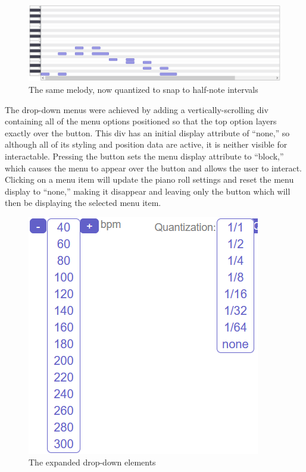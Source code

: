 \begin{figure}[h!]
  \centering
  \includegraphics[width=\linewidth]{image/TwinkleQuantized.png}
  \caption{The same melody, now quantized to snap to half-note intervals}
  \label{fig:twinkle_quantized}
\end{figure}

The drop-down menus were achieved by adding a vertically-scrolling div containing all of the menu
options positioned so that the top option layers exactly over the button. This div has an initial
display attribute of “none,” so although all of its styling and position data are active, it is
neither visible for interactable. Pressing the button sets the menu display attribute to “block,”
which causes the menu to appear over the button and allows the user to interact. Clicking on a menu
item will update the piano roll settings and reset the menu display to “none,” making it disappear
and leaving only the button which will then be displaying the selected menu item.

\begin{figure}[h!]
  \centering
  \includegraphics[width=0.4\linewidth]{image/Dropdowns.png}
  \caption{The expanded drop-down elements}
  \label{fig:dropdowns}
\end{figure}

